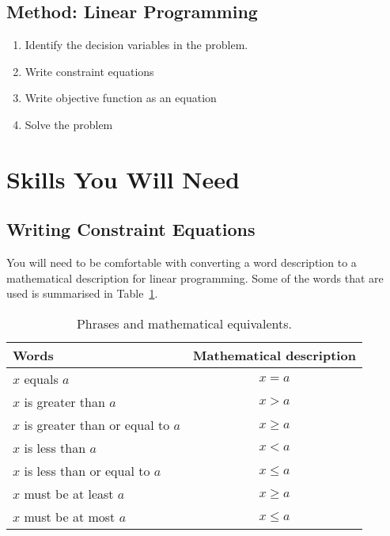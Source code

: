 \subsection{Method: Linear Programming}{
\begin{enumerate}
\item{Identify the decision variables in the problem.}
\item{Write constraint equations}
\item{Write objective function as an equation}
\item{Solve the problem}
\end{enumerate}}

\section{Skills You Will Need}
\subsection{Writing Constraint Equations}
You will need to be comfortable with converting a word description to a mathematical description for linear programming. Some of the words that are used is summarised in Table~\ref{m:lp11:language}.

\begin{table}[htbp]
\begin{center}
\caption{Phrases and mathematical equivalents.}
\label{m:lp11:language}
\begin{tabular}{|l|c|}\hline
Words & Mathematical description\\\hline\hline
$x$ equals $a$ & $x = a$ \\
$x$ is greater than $a$ & $x > a$\\
$x$ is greater than or equal to $a$ & $x \geq a$\\
$x$ is less than $a$ & $x < a$ \\
$x$ is less than or equal to $a$ & $x \leq a$ \\
$x$ must be at least $a$ & $x \geq a$ \\
$x$ must be at most $a$ & $x \leq a$\\\hline
\end{tabular}
\end{center}
\end{table}

